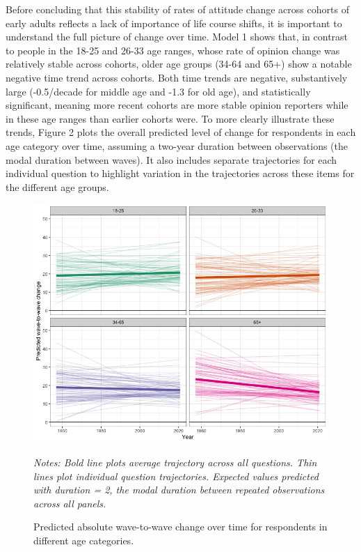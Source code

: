 \documentclass[
  12pt,
]{article}
\begin{document}
Before concluding that this stability of rates of attitude change across cohorts of early adults reflects a lack of importance of life course shifts, it is important to understand the full picture of change over time. Model 1 shows that, in contrast to people in the 18-25 and 26-33 age ranges, whose rate of opinion change was relatively stable across cohorts, older age groups (34-64 and 65+) show a notable negative time trend across cohorts. Both time trends are negative, substantively large (-0.5/decade for middle age and -1.3 for old age), and statistically significant, meaning more recent cohorts are more stable opinion reporters while in these age ranges than earlier cohorts were. To more clearly illustrate these trends, Figure 2 plots the overall predicted level of change for respondents in each age category over time, assuming a two-year duration between observations (the modal duration between waves). It also includes separate trajectories for each individual question to highlight variation in the trajectories across these items for the different age groups.

\begin{figure}[]
\begin{center}
\caption{Predicted absolute wave-to-wave change over time for respondents in different age categories.}

\includegraphics[width=1\linewidth]{../figures/trajectory_plot}

\end{center}
\footnotesize{\textit{Notes: Bold line plots average trajectory across all questions. Thin lines plot individual question trajectories. Expected values predicted with duration = 2, the modal duration between repeated observations across all panels.}}
\end{figure}
\end{document}
